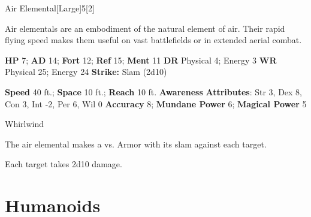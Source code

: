   \begin{monsection}{Air Elemental}[Large]{5}[2]
    \vspace{-1em}\vspace{-1em}
    \vspace{0em}

    
    Air elementals are an embodiment of the natural element of air.
    Their rapid flying speed makes them useful on vast battlefields or in extended aerial combat.
  

    \begin{spellcontent}
      \begin{spelltargetinginfo}
        \pari \textbf{HP} 7;
          \textbf{AD} 14;
          \textbf{Fort} 12;
          \textbf{Ref} 15;
          \textbf{Ment} 11
        \pari \textbf{DR} Physical 4; Energy 3
        \pari \textbf{WR} Physical 25; Energy 24
        \pari \textbf{Strike:}
            Slam  (2d10)
      \end{spelltargetinginfo}
    \end{spellcontent}
    \begin{monsterfooter}
      \pari \textbf{Speed} 40 ft.;
        \textbf{Space} 10 ft.;
        \textbf{Reach} 10 ft.
      \pari \textbf{Awareness} 
      \pari \textbf{Attributes}:
        Str 3, Dex 8,
        Con 3, Int -2,
        Per 6, Wil 0
      \pari \textbf{Accuracy} 8;
        \textbf{Mundane Power} 6;
      \textbf{Magical Power} 5
    \end{monsterfooter}
  \end{monsection}
  \begin{freeability}{Whirlwind}
      
      The air elemental makes a 
         vs. Armor
        with its slam against each target.
    
    \hit Each target takes 2d10  damage.
    \end{freeability}
  
        \section{Humanoids}
      
